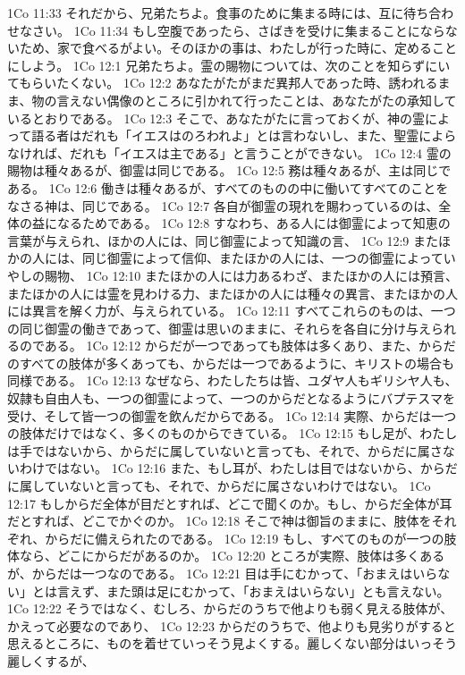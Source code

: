 1Co 11:33  それだから、兄弟たちよ。食事のために集まる時には、互に待ち合わせなさい。
1Co 11:34  もし空腹であったら、さばきを受けに集まることにならないため、家で食べるがよい。そのほかの事は、わたしが行った時に、定めることにしよう。
1Co 12:1  兄弟たちよ。霊の賜物については、次のことを知らずにいてもらいたくない。
1Co 12:2  あなたがたがまだ異邦人であった時、誘われるまま、物の言えない偶像のところに引かれて行ったことは、あなたがたの承知しているとおりである。
1Co 12:3  そこで、あなたがたに言っておくが、神の霊によって語る者はだれも「イエスはのろわれよ」とは言わないし、また、聖霊によらなければ、だれも「イエスは主である」と言うことができない。
1Co 12:4  霊の賜物は種々あるが、御霊は同じである。
1Co 12:5  務は種々あるが、主は同じである。
1Co 12:6  働きは種々あるが、すべてのものの中に働いてすべてのことをなさる神は、同じである。
1Co 12:7  各自が御霊の現れを賜わっているのは、全体の益になるためである。
1Co 12:8  すなわち、ある人には御霊によって知恵の言葉が与えられ、ほかの人には、同じ御霊によって知識の言、
1Co 12:9  またほかの人には、同じ御霊によって信仰、またほかの人には、一つの御霊によっていやしの賜物、
1Co 12:10  またほかの人には力あるわざ、またほかの人には預言、またほかの人には霊を見わける力、またほかの人には種々の異言、またほかの人には異言を解く力が、与えられている。
1Co 12:11  すべてこれらのものは、一つの同じ御霊の働きであって、御霊は思いのままに、それらを各自に分け与えられるのである。
1Co 12:12  からだが一つであっても肢体は多くあり、また、からだのすべての肢体が多くあっても、からだは一つであるように、キリストの場合も同様である。
1Co 12:13  なぜなら、わたしたちは皆、ユダヤ人もギリシヤ人も、奴隷も自由人も、一つの御霊によって、一つのからだとなるようにバプテスマを受け、そして皆一つの御霊を飲んだからである。
1Co 12:14  実際、からだは一つの肢体だけではなく、多くのものからできている。
1Co 12:15  もし足が、わたしは手ではないから、からだに属していないと言っても、それで、からだに属さないわけではない。
1Co 12:16  また、もし耳が、わたしは目ではないから、からだに属していないと言っても、それで、からだに属さないわけではない。
1Co 12:17  もしからだ全体が目だとすれば、どこで聞くのか。もし、からだ全体が耳だとすれば、どこでかぐのか。
1Co 12:18  そこで神は御旨のままに、肢体をそれぞれ、からだに備えられたのである。
1Co 12:19  もし、すべてのものが一つの肢体なら、どこにからだがあるのか。
1Co 12:20  ところが実際、肢体は多くあるが、からだは一つなのである。
1Co 12:21  目は手にむかって、「おまえはいらない」とは言えず、また頭は足にむかって、「おまえはいらない」とも言えない。
1Co 12:22  そうではなく、むしろ、からだのうちで他よりも弱く見える肢体が、かえって必要なのであり、
1Co 12:23  からだのうちで、他よりも見劣りがすると思えるところに、ものを着せていっそう見よくする。麗しくない部分はいっそう麗しくするが、
